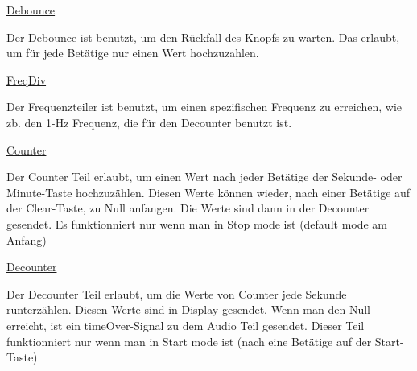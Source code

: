 \documentclass[a4paper, 11pt]{article}
\begin{document}
	    \begin{flushleft} %
	    \underline{\large Debounce} %
	    \vspace{0.1cm} %
    
	     {\small Der Debounce ist benutzt, um den Rückfall des Knopfs zu warten.  Das erlaubt, um für jede Betätige nur einen Wert hochzuzahlen.} %
     
	     \vspace{1cm} %
     
	     \underline{\large FreqDiv}
     
	     \vspace{0.1cm}
     
	      {\small Der Frequenzteiler ist benutzt, um einen spezifischen Frequenz zu erreichen, wie zb. den 1-Hz Frequenz, die für den Decounter benutzt ist.  
		  }
     
	     \newpage
     
	     \underline{\large Counter}
     
	     \vspace{0.1cm}
     
		  {\small Der Counter Teil erlaubt, um einen Wert nach jeder Betätige der Sekunde- oder Minute-Taste hochzuzählen. Diesen Werte können wieder, nach einer Betätige auf der Clear-Taste, zu Null anfangen.
		  \newline
		  Die Werte sind dann in der Decounter gesendet.
		  \newline
	       Es funktionniert nur wenn man in Stop mode ist (default mode am Anfang)
	      }
     
		 \vspace{1cm}
     
	     \underline{\large Decounter} 
     
	     \vspace{0.1cm}
     
	     {\small Der Decounter Teil erlaubt, um die Werte von Counter jede Sekunde runterzählen. Diesen Werte sind in Display gesendet.
	     \newline
	     Wenn man den Null erreicht, ist ein timeOver-Signal zu dem Audio Teil gesendet.
		 \newline
	     Dieser Teil funktionniert nur wenn man in Start mode ist (nach eine Betätige auf der Start-Taste)
	     }
     
	     \vspace{1cm}
     

\end{flushleft}
\end{document}
